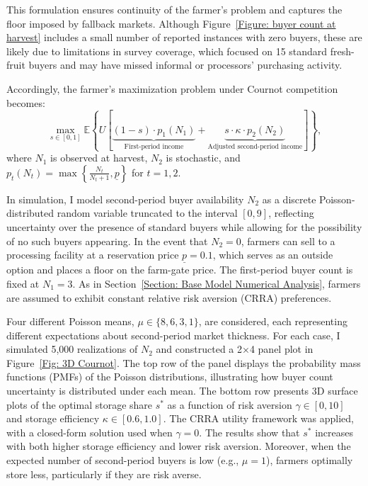 This formulation ensures continuity of the farmer's problem and captures the floor imposed by fallback markets. Although Figure~\ref{Figure: buyer count at harvest} includes a small number of reported instances with zero buyers, these are likely due to limitations in survey coverage, which focused on 15 standard fresh-fruit buyers and may have missed informal or processors' purchasing activity.

Accordingly, the farmer's maximization problem under Cournot competition becomes:
\begin{equation}
\label{eq:Cournot objective function}
\max_{s \in [0,1]} \mathbb{E} \left\{ U \left[ 
\underbrace{(1-s) \cdot p_1(N_1)}_{\text{First-period income}} 
+ \underbrace{s \cdot \kappa \cdot p_2(N_2)}_{\text{Adjusted second-period income}} 
\right] \right\},
\end{equation}
where $N_1$ is observed at harvest, $N_2$ is stochastic, and 
$p_t(N_t) = \max\left\{ \tfrac{N_t}{N_t + 1}, \underline{p} \right\}$ for $t = 1,2$. 


In simulation, I model second-period buyer availability $N_2$ as a discrete Poisson-distributed random variable truncated to the interval $[0,9]$, reflecting uncertainty over the presence of standard buyers while allowing for the possibility of no such buyers appearing. In the event that $N_2 = 0$, farmers can sell to a processing facility at a reservation price $\underline{p} = 0.1$, which serves as an outside option and places a floor on the farm-gate price. The first-period buyer count is fixed at $N_1 = 3$. As in Section~\ref{Section: Base Model Numerical Analysis}, farmers are assumed to exhibit constant relative risk aversion (CRRA) preferences.

Four different Poisson means, $\mu \in \{8, 6, 3, 1\}$, are considered, each representing different expectations about second-period market thickness. For each case, I simulated 5,000 realizations of $N_2$ and constructed a 2×4 panel plot in Figure~\ref{Fig: 3D Cournot}. The top row of the panel displays the probability mass functions (PMFs) of the Poisson distributions, illustrating how buyer count uncertainty is distributed under each mean. The bottom row presents 3D surface plots of the optimal storage share $s^*$ as a function of risk aversion $\gamma \in [0,10]$ and storage efficiency $\kappa \in [0.6, 1.0]$. The CRRA utility framework was applied, with a closed-form solution used when $\gamma = 0$. The results show that $s^*$ increases with both higher storage efficiency and lower risk aversion. Moreover, when the expected number of second-period buyers is low (e.g., $\mu = 1$), farmers optimally store less, particularly if they are risk averse.

